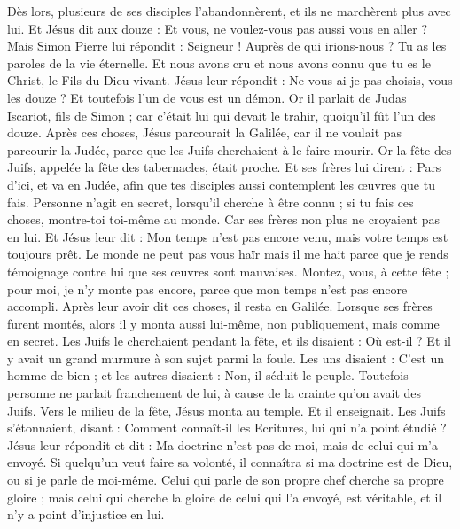 \begin{multicols}{2}
Dès lors, plusieurs de ses disciples l'abandonnèrent, et ils ne marchèrent plus avec lui.
Et Jésus dit aux douze : Et vous, ne voulez-vous pas aussi vous en aller ?
Mais Simon Pierre lui répondit : Seigneur ! Auprès de qui irions-nous ? Tu as les paroles de la vie éternelle.
Et nous avons cru et nous avons connu que tu es le Christ, le Fils du Dieu vivant.
Jésus leur répondit : Ne vous ai-je pas choisis, vous les douze ? Et toutefois l'un de vous est un démon.
Or il parlait de Judas Iscariot, fils de Simon ; car c'était lui qui devait le trahir, quoiqu'il fût l'un des douze.
\VerseOne{}Après ces choses, Jésus parcourait la Galilée, car il ne voulait pas parcourir la Judée, parce que les Juifs cherchaient à le faire mourir.
Or la fête des Juifs, appelée la fête des tabernacles, était proche.
Et ses frères lui dirent : Pars d'ici, et va en Judée, afin que tes disciples aussi contemplent les œuvres que tu fais.
Personne n'agit en secret, lorsqu'il cherche à être connu ; si tu fais ces choses, montre-toi toi-même au monde.
Car ses frères non plus ne croyaient pas en lui.
Et Jésus leur dit : Mon temps n'est pas encore venu, mais votre temps est toujours prêt.
Le monde ne peut pas vous haïr mais il me hait parce que je rends témoignage contre lui que ses œuvres sont mauvaises.
Montez, vous, à cette fête ; pour moi, je n'y monte pas encore, parce que mon temps n'est pas encore accompli.
Après leur avoir dit ces choses, il resta en Galilée.
Lorsque ses frères furent montés, alors il y monta aussi lui-même, non publiquement, mais comme en secret.
Les Juifs le cherchaient pendant la fête, et ils disaient : Où est-il ?
Et il y avait un grand murmure à son sujet parmi la foule. Les uns disaient : C'est un homme de bien ; et les autres disaient : Non, il séduit le peuple.
Toutefois personne ne parlait franchement de lui, à cause de la crainte qu'on avait des Juifs.
Vers le milieu de la fête, Jésus monta au temple. Et il enseignait.
Les Juifs s'étonnaient, disant : Comment connaît-il les Ecritures, lui qui n'a point étudié ?
Jésus leur répondit et dit : Ma doctrine n'est pas de moi, mais de celui qui m'a envoyé.
Si quelqu'un veut faire sa volonté, il connaîtra si ma doctrine est de Dieu, ou si je parle de moi-même.
Celui qui parle de son propre chef cherche sa propre gloire ; mais celui qui cherche la gloire de celui qui l'a envoyé, est véritable, et il n'y a point d'injustice en lui.

\end{multicols}
